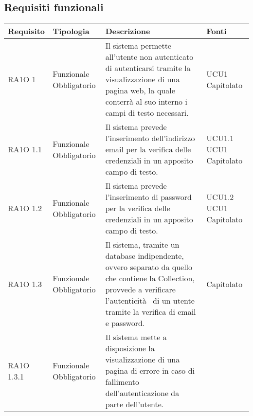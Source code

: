 \subsection{Requisiti funzionali }

      \begin{center}
      \bgroup
      \def\arraystretch{1.8}
      \begin{longtable}{ | l | p{2cm} | p{5cm} | p{1.7cm} |}
    
      \cellcolor[gray]{0.9} \textbf{Requisito} & \cellcolor[gray]{0.9} \textbf{Tipologia} 
      & \cellcolor[gray]{0.9} \textbf{Descrizione} & \cellcolor[gray]{0.9} \textbf{Fonti} \\ \hline
      
        RA1O 1 & Funzionale \newline  Obbligatorio  & Il sistema permette all'utente non autenticato di autenticarsi tramite la visualizzazione di una pagina web, la quale conterrà al suo interno i campi di testo necessari. &  UCU1 \newline  Capitolato \newline  \\ \hline      
        RA1O 1.1 & Funzionale \newline  Obbligatorio  & Il sistema prevede l'inserimento dell'indirizzo email per la verifica delle credenziali in un apposito campo di testo. &  UCU1.1 \newline  UCU1 \newline  Capitolato \newline  \\ \hline      
        RA1O 1.2 & Funzionale \newline  Obbligatorio  & Il sistema prevede l'inserimento di password per la verifica delle credenziali in un apposito campo di testo. &  UCU1.2 \newline  UCU1 \newline  Capitolato \newline  \\ \hline      
        RA1O 1.3  & Funzionale \newline  Obbligatorio  & Il sistema, tramite un database indipendente, ovvero separato da quello che contiene la Collection, provvede a verificare l'autenticità  di un utente tramite la verifica di email e password. &  Capitolato \newline  \\ \hline      
        RA1O 1.3.1 & Funzionale \newline  Obbligatorio  & Il sistema mette a disposizione la visualizzazione di una pagina di errore in caso di fallimento dell'autenticazione da parte dell'utente.

\end{longtable}
\end{center}
